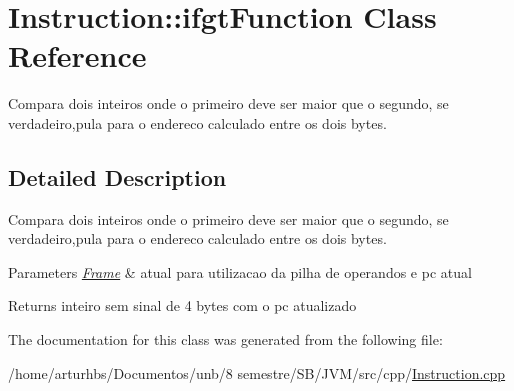 \hypertarget{classInstruction_1_1ifgtFunction}{}\section{Instruction\+:\+:ifgt\+Function Class Reference}
\label{classInstruction_1_1ifgtFunction}


Compara dois inteiros onde o primeiro deve ser maior que o segundo, se verdadeiro,pula para o endereco calculado entre os dois bytes.  




\subsection{Detailed Description}
Compara dois inteiros onde o primeiro deve ser maior que o segundo, se verdadeiro,pula para o endereco calculado entre os dois bytes. 


\begin{DoxyParams}{Parameters}
{\em \hyperlink{classFrame}{Frame}} & atual para utilizacao da pilha de operandos e pc atual \\
\hline
\end{DoxyParams}
\begin{DoxyReturn}{Returns}
inteiro sem sinal de 4 bytes com o pc atualizado 
\end{DoxyReturn}


The documentation for this class was generated from the following file\+:\begin{DoxyCompactItemize}
\item 
/home/arturhbs/\+Documentos/unb/8 semestre/\+S\+B/\+J\+V\+M/src/cpp/\hyperlink{Instruction_8cpp}{Instruction.\+cpp}\end{DoxyCompactItemize}
